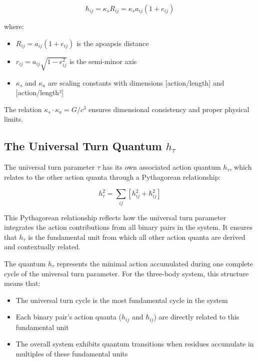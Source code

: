 \documentclass{article}
\begin{document}
\begin{equation}
\hbar_{ij} = \kappa_s R_{ij} = \kappa_s a_{ij}(1+e_{ij})
\end{equation}

where:
\begin{itemize}
\item $R_{ij} = a_{ij}(1+e_{ij})$ is the apoapsis distance
\item $r_{ij} = a_{ij}\sqrt{1-e_{ij}^2}$ is the semi-minor axis
\item $\kappa_s$ and $\kappa_a$ are scaling constants with dimensions [action/length] and [action/length²]
\end{itemize}

The relation $\kappa_s \cdot \kappa_a = G/c^3$ ensures dimensional consistency and proper physical limits.

\subsection{The Universal Turn Quantum $h_\tau$}

The universal turn parameter $\tau$ has its own associated action quantum $h_\tau$, which relates to the other action quanta through a Pythagorean relationship:

\begin{equation}
h_\tau^2 = \sum_{ij} \left[ h_{ij}^2 + \hbar_{ij}^2 \right]
\end{equation}

This Pythagorean relationship reflects how the universal turn parameter integrates the action contributions from all binary pairs in the system. It ensures that $h_\tau$ is the fundamental unit from which all other action quanta are derived and contextually related.

The quantum $h_\tau$ represents the minimal action accumulated during one complete cycle of the universal turn parameter. For the three-body system, this structure means that:

\begin{itemize}
\item The universal turn cycle is the most fundamental cycle in the system
\item Each binary pair's action quanta ($h_{ij}$ and $\hbar_{ij}$) are directly related to this fundamental unit
\item The overall system exhibits quantum transitions when residues accumulate in multiples of these fundamental units
\end{itemize}
\end{document}
